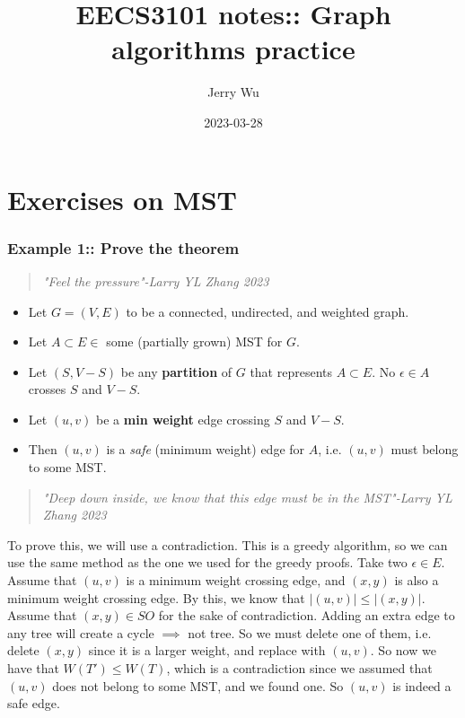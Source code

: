 \documentclass[12pt]{book}
\title{EECS3101 notes:: Graph algorithms practice}
\author{Jerry Wu}
\date{2023-03-28}
\begin{document}
\maketitle
\chapter*{Exercises on MST}

\subsection*{Example 1:: Prove the theorem}

\begin{quote}
    \textit{"Feel the pressure"-Larry YL Zhang 2023}
\end{quote}

\begin{itemize}
    \item Let $G=(V,E)$ to be a connected, undirected, and weighted graph.
    \item Let $A\subset E \in$ some (partially grown) MST for $G$.
    \item Let $(S, V-S)$ be any \textbf{partition} of $G$ that represents $A\subset E$. No $\epsilon \in A$ crosses $S$ and $V-S$.
    \item Let $(u,v)$ be a \textbf{min weight} edge crossing $S$ and $V-S$.
    \item Then $(u,v)$ is a \textit{safe} (minimum weight) edge for $A$, i.e. $(u,v)$ must belong to some MST.
\end{itemize}

\begin{quote}
    \textit{"Deep down inside, we know that this edge must be in the MST"-Larry YL Zhang 2023}
\end{quote}

To prove this, we will use a contradiction. This is a greedy algorithm, so we can use the same method as the one we used for the greedy proofs. Take two $\epsilon \in E$. Assume that $(u,v)$ is a minimum weight crossing edge, and $(x,y)$ is also a minimum weight crossing edge. By this, we know that $|(u,v)|\leq |(x,y)|$. Assume that $(x,y)\in SO$ for the sake of contradiction. Adding an extra edge to any tree will create a cycle $\implies$ not tree. So we must delete one of them, i.e. delete $(x,y)$ since it is a larger weight, and replace with $(u,v)$. So now we have that $W(T')\leq W(T)$, which is a contradiction since we assumed that $(u,v)$ does not belong to some MST, and we found one. So $(u,v)$ is indeed a safe edge.
\newpage
\end{document}
